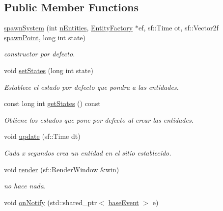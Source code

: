 \subsection*{Public Member Functions}
\begin{DoxyCompactItemize}
\item 
\hyperlink{classant_1_1spawn_system_aa5b27276b3bd50f135602081fd126a8a}{spawn\+System} (int \hyperlink{classant_1_1spawn_system_ac15adf011d5664cfcecad025ece96c09}{n\+Entities}, \hyperlink{classant_1_1_entity_factory}{Entity\+Factory} $\ast$ef, sf\+::\+Time ot, sf\+::\+Vector2f \hyperlink{classant_1_1spawn_system_ae44b8fd02249453a7c4b4390bc7e32c7}{spawn\+Point}, long int state)
\begin{DoxyCompactList}\small\item\em constructor por defecto. \end{DoxyCompactList}\item 
void \hyperlink{classant_1_1spawn_system_a39010e5a88525ea18c0524b296ad18bf}{set\+States} (long int state)
\begin{DoxyCompactList}\small\item\em Establece el estado por defecto que pondra a las entidades. \end{DoxyCompactList}\item 
const long int \hyperlink{classant_1_1spawn_system_a958514aaac9187f9f95a8de9909d8238}{get\+States} () const 
\begin{DoxyCompactList}\small\item\em Obtiene los estados que pone por defecto al crear las entidades. \end{DoxyCompactList}\item 
void \hyperlink{classant_1_1spawn_system_a080ec242e6f934bea895dbc3429bea9b}{update} (sf\+::\+Time dt)
\begin{DoxyCompactList}\small\item\em Cada x segundos crea un entidad en el sitio establecido. \end{DoxyCompactList}\item 
void \hyperlink{classant_1_1spawn_system_a1eae29ce581e7625c70e9327c3b9ce1b}{render} (sf\+::\+Render\+Window \&win)
\begin{DoxyCompactList}\small\item\em no hace nada. \end{DoxyCompactList}\item 
void \hyperlink{classant_1_1spawn_system_a3950f006745c8beba1c579e2ea88b8d1}{on\+Notify} (std\+::shared\+\_\+ptr$<$ \hyperlink{classant_1_1base_event}{base\+Event} $>$ e)

\end{DoxyCompactItemize}
